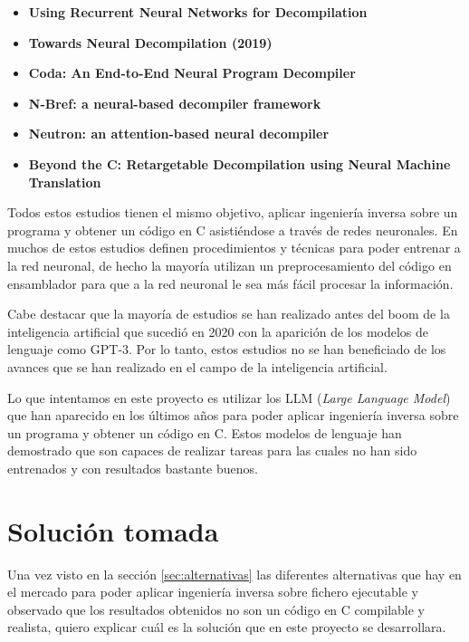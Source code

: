 \begin{itemize}
\item \textbf{Using Recurrent Neural Networks for Decompilation} \cite{8330222}
\item \textbf{Towards Neural Decompilation (2019)} \cite{KatzOmer2019TND}
\item \textbf{Coda: An End-to-End Neural Program Decompiler} \cite{FuCheng2019ANPD}
\item \textbf{N-Bref: a neural-based decompiler framework} \cite{fu2021nbref}
\item \textbf{Neutron: an attention-based neural decompiler} \cite{LiangRuigang2021Naan}
\item \textbf{Beyond the C: Retargetable Decompilation using Neural Machine Translation} \cite{HosseiniIman2022BtCR}
\end{itemize}

Todos estos estudios tienen el mismo objetivo, aplicar ingeniería inversa sobre un programa
y obtener un código en C asistiéndose a través de redes neuronales. En muchos de estos estudios
definen procedimientos y técnicas para poder entrenar a la red neuronal, de hecho la mayoría
utilizan un preprocesamiento del código en ensamblador para que a la red neuronal le sea más
fácil procesar la información.

Cabe destacar que la mayoría de estudios se han realizado antes del boom de la inteligencia artificial
que sucedió en 2020 con la aparición de los modelos de lenguaje como GPT-3. Por lo tanto, estos
estudios no se han beneficiado de los avances que se han realizado en el campo de la inteligencia
artificial.

Lo que intentamos en este proyecto es utilizar los LLM (\textit{Large Language Model}) que han aparecido
en los últimos años para poder aplicar ingeniería inversa sobre un programa y obtener un código
en C. Estos modelos de lenguaje han demostrado que son capaces de realizar tareas para las cuales
no han sido entrenados y con resultados bastante buenos.

\section{Solución tomada}
\label{sec:solucion}


Una vez visto en la sección \ref{sec:alternativas} las diferentes alternativas que hay
en el mercado para poder aplicar ingeniería inversa sobre fichero ejecutable y observado
que los resultados obtenidos no son un código en C compilable y realista, quiero explicar
cuál es la solución que en este proyecto se desarrollara.

